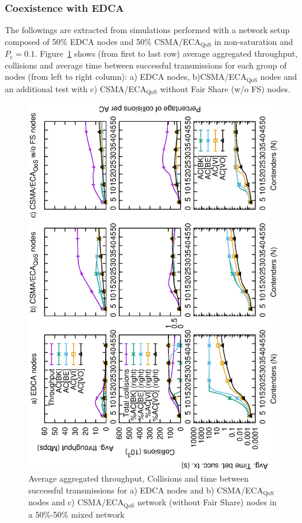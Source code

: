 	

\subsubsection{Coexistence with EDCA}
The followings are extracted from simulations performed with a network setup composed of 50\% EDCA nodes and 50\% CSMA/ECA$_{\text{QoS}}$ in non-saturation and $P_e=0.1$. Figure~\ref{fig:multiplotCombinedUnsat} shows (from first to last row) average aggregated throughput, collisions and average time between successful transmissions for each group of nodes (from left to right column): a) EDCA nodes, b)CSMA/ECA$_{\text{QoS}}$ nodes and an additional test with c) CSMA/ECA$_{\text{QoS}}$ without Fair Share (w/o FS) nodes.

\begin{figure}[tb]
	\centering
		\includegraphics[width=0.55\linewidth,angle = -90]{figures/multiplot-combined-unsat-error-0-1.eps}
		\caption{Average aggregated throughput, Collisions and time between successful transmissions for a) EDCA nodes and b) CSMA/ECA$_{\text{QoS}}$ nodes and c) CSMA/ECA$_{\text{QoS}}$ network (without Fair Share) nodes in a 50\%-50\% mixed network}
		\label{fig:multiplotCombinedUnsat}
\end{figure}

